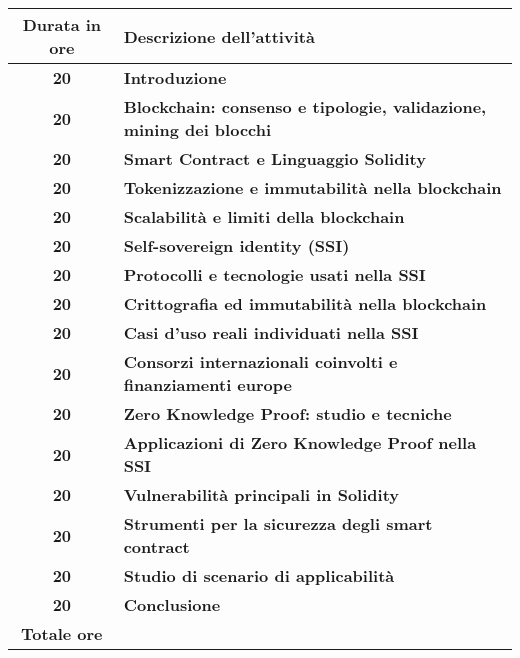 

\begin{tabularx}{\textwidth}{|c|X|}
	\hline
	\textbf{Durata in ore} & \textbf{Descrizione dell'attività} \\\hline
	
	\textbf{20} & \textbf{Introduzione} \\	 
    \hline
    
    \textbf{20} & \textbf{Blockchain: consenso e tipologie, validazione, mining dei blocchi} \\	 
    \hline
    
    \textbf{20} & \textbf{Smart Contract e Linguaggio Solidity} \\	 
    \hline

    \textbf{20} & \textbf{Tokenizzazione e immutabilità nella blockchain} \\	 
    \hline

    \textbf{20} & \textbf{Scalabilità e limiti della blockchain} \\	 
    \hline

    \textbf{20} & \textbf{Self-sovereign identity (SSI)} \\	 
    \hline

    \textbf{20} & \textbf{Protocolli e tecnologie usati nella SSI} \\	 
    \hline

    \textbf{20} & \textbf{Crittografia ed immutabilità nella blockchain} \\	 
    \hline

    \textbf{20} & \textbf{Casi d'uso reali individuati nella SSI} \\	 
    \hline

    \textbf{20} & \textbf{Consorzi internazionali coinvolti e finanziamenti europe} \\	 
    \hline

    \textbf{20} & \textbf{Zero Knowledge Proof: studio e tecniche} \\	 
    \hline

    \textbf{20} & \textbf{Applicazioni di Zero Knowledge Proof nella SSI} \\	 
    \hline

    \textbf{20} & \textbf{Vulnerabilità principali in Solidity} \\	 
    \hline

    \textbf{20} & \textbf{Strumenti per la sicurezza degli smart contract} \\	 
    \hline

    \textbf{20} & \textbf{Studio di scenario di applicabilità} \\	 
    \hline

    \textbf{20} & \textbf{Conclusione} \\	 
    \hline
	
	\textbf{Totale ore} & \multicolumn{1}{|c|}{\textbf{\totaleOre}} \\\hline
	
	
\end{tabularx}
